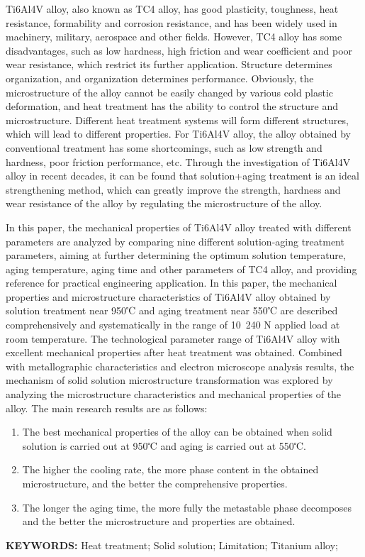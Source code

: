 \documentclass[
class = book,
zihao = -4,
font = noto,
paper = a4paper,
openany,
AutoFakeBold
]{easybook}
\begin{document}
\begin{enabstract}
	{\rmfamily
	Ti6Al4V alloy, also known as TC4 alloy, has good plasticity, toughness, heat resistance, formability and corrosion resistance, and has been widely used in machinery, military, aerospace and other fields. However, TC4 alloy has some disadvantages, such as low hardness, high friction and wear coefficient and poor wear resistance, which restrict its further application. Structure determines organization, and organization determines performance. Obviously, the microstructure of the alloy cannot be easily changed by various cold plastic deformation, and heat treatment has the ability to control the structure and microstructure. Different heat treatment systems will form different structures, which will lead to different properties. For Ti6Al4V alloy, the alloy obtained by conventional treatment has some shortcomings, such as low strength and hardness, poor friction performance, etc. Through the investigation of Ti6Al4V alloy in recent decades, it can be found that solution+aging treatment is an ideal strengthening method, which can greatly improve the strength, hardness and wear resistance of the alloy by regulating the microstructure of the alloy.

	In this paper, the mechanical properties of Ti6Al4V alloy treated with different parameters are analyzed by comparing nine different solution-aging treatment parameters, aiming at further determining the optimum solution temperature, aging temperature, aging time and other parameters of TC4 alloy, and providing reference for practical engineering application. In this paper, the mechanical properties and microstructure characteristics of Ti6Al4V alloy obtained by solution treatment near 950℃ and aging treatment near 550℃ are described comprehensively and systematically in the range of 10~240 N applied load at room temperature. The technological parameter range of Ti6Al4V alloy with excellent mechanical properties after heat treatment was obtained. Combined with metallographic characteristics and electron microscope analysis results, the mechanism of solid solution microstructure transformation was explored by analyzing the microstructure characteristics and mechanical properties of the alloy. The main research results are as follows:
	\begin{enumerate}
		\item The best mechanical properties of the alloy can be obtained when solid solution is carried out at 950℃ and aging is carried out at 550℃.
		\item The higher the cooling rate, the more phase content in the obtained microstructure, and the better the comprehensive properties.
		\item The longer the aging time, the more fully the metastable phase decomposes and the better the microstructure and properties are obtained.
	\end{enumerate}
\textbf{KEYWORDS: } Heat treatment; Solid solution; Limitation; Titanium alloy; }
\end{enabstract}
	\newpage
	\tableofcontents
	\thispagestyle{Xju}
	\setcounter{page}{0}
\end{document}

